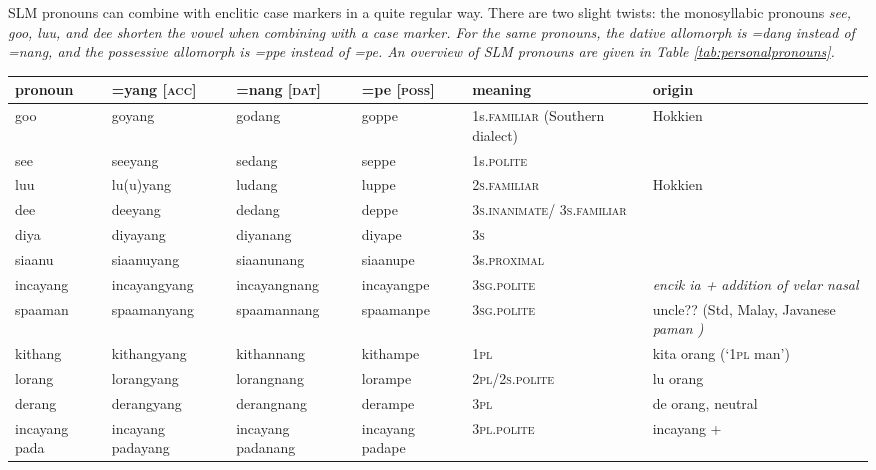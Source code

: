 SLM pronouns can combine with enclitic case markers in a quite regular way. There are two slight twists: the monosyllabic pronouns \em see, goo, luu, \em and \em dee \em shorten the vowel when combining with a case marker. For the same pronouns, the dative allomorph is \em =dang \em instead of \em =nang\em, and the possessive allomorph is \em =ppe \em instead of \em =pe\em.
An overview of SLM pronouns are given in Table \ref{tab:personalpronouns}. 


\begin{sidewaystable}
    \centering
	\begin{center}
	\begin{tabular}{llllp{2cm}p{3cm}}
	pronoun &  =yang [\textsc{acc}] & =nang [\textsc{dat}] &=pe [\textsc{poss}]	& meaning & origin\\
\hline
	goo 	& goyang   	& godang & goppe 	& 1s.\textsc{familiar} (Southern dialect)& Hokkien \citep{Adelaar1991,Ansaldo2005ms} \\
	see 	& seeyang 	& sedang & seppe	& 1s.\textsc{polite} \\
	luu 	& lu(u)yang	& ludang & luppe	& \textsc{2s.familiar} & Hokkien \citep{Adelaar1991,Ansaldo2005ms} \\
	dee 	& deeyang 	& dedang & deppe 	& \textsc{3s.inanimate}/ \textsc{3s.familiar} & \\%
	diya	& diyayang	& diyanang & diyape	& \textsc{3s} \\%
	siaanu  & siaanuyang   	& siaanunang & siaanupe	& 3s.\textsc{proximal} \\
	incayang  & incayangyang & incayangnang	& incayangpe & 3\textsc{sg}.\textsc{polite} & \em encik ia \em + addition of velar nasal \citep{Slomanson2008ismil} \\
	spaaman & spaamanyang  	& spaamannang 	& spaamanpe & 3\textsc{sg}.\textsc{polite} & uncle?? (Std, Malay, Javanese \em paman \em \citep[141]{Adelaar1985})\\
	kithang & kithangyang  	& kithannang 	& kithampe &1\textsc{pl} & \lt *kita orang (`1\textsc{pl} man')\\
	lorang{\footnotemark}  	& lorangyang 	& lorangnang &lorampe	& 2\textsc{pl}/\textsc{2s.polite} & \lt *lu orang \\
	derang  &  derangyang	& derangnang 	& derampe & 3\textsc{pl} &\lt *de orang, neutral\\
	incayang pada & incayang padayang 	& incayang padanang 	& incayang padape & \textsc{3pl.polite} & incayang + \trs{pada}{\textsc{pl}} \\
	\end{tabular}
	\end{center}
	\caption[Pronouns]{Pronouns.  The etymology of the plural pronouns includes a contraction of  to \em rang \em \citep{AdelaarEtAl1996,Adelaar2005struct,Adelaar1991}.%
 	}
	\label{tab:personalpronouns}
\end{sidewaystable}

